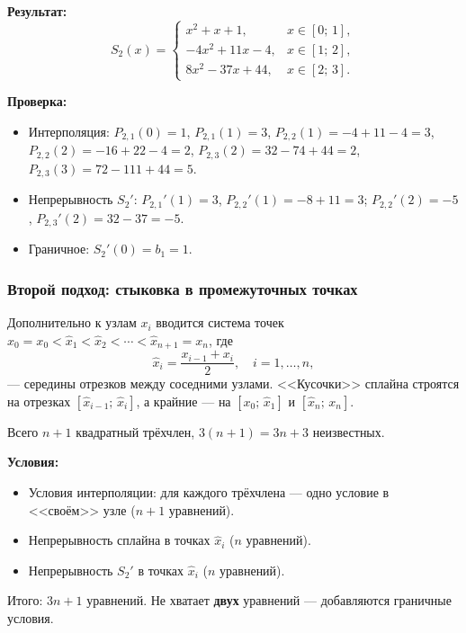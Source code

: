 \textbf{Результат:}
\[
    S_2(x) = \begin{cases}
        x^2 + x + 1, & x \in [0;\, 1], \\
        -4x^2 + 11x - 4, & x \in [1;\, 2], \\
        8x^2 - 37x + 44, & x \in [2;\, 3].
    \end{cases}
\]

\textbf{Проверка:}
\begin{itemize}
    \item Интерполяция: $P_{2,1}(0) = 1$\;\checkmark, $P_{2,1}(1) = 3$\;\checkmark, $P_{2,2}(1) = -4+11-4 = 3$\;\checkmark, $P_{2,2}(2) = -16+22-4 = 2$\;\checkmark, $P_{2,3}(2) = 32-74+44 = 2$\;\checkmark, $P_{2,3}(3) = 72-111+44 = 5$\;\checkmark.
    \item Непрерывность $S_2'$: $P_{2,1}'(1) = 3$, $P_{2,2}'(1) = -8+11 = 3$\;\checkmark; $P_{2,2}'(2) = -5$, $P_{2,3}'(2) = 32-37 = -5$\;\checkmark.
    \item Граничное: $S_2'(0) = b_1 = 1$\;\checkmark.
\end{itemize}


\subsubsection*{Второй подход: стыковка в промежуточных точках}

Дополнительно к узлам $x_i$ вводится система точек $\hat{x}_0 = x_0 < \hat{x}_1 < \hat{x}_2 < \cdots < \hat{x}_{n+1} = x_n$, где
\[
    \hat{x}_i = \frac{x_{i-1} + x_i}{2}, \quad i = 1, \ldots, n,
\]
--- середины отрезков между соседними узлами. <<Кусочки>> сплайна строятся на отрезках $[\hat{x}_{i-1};\, \hat{x}_i]$, а крайние --- на $[x_0;\, \hat{x}_1]$ и $[\hat{x}_n;\, x_n]$.

Всего $n + 1$ квадратный трёхчлен, $3(n+1) = 3n + 3$ неизвестных.

\textbf{Условия:}
\begin{itemize}
    \item Условия интерполяции: для каждого трёхчлена --- одно условие в <<своём>> узле ($n + 1$ уравнений).
    \item Непрерывность сплайна в точках $\hat{x}_i$ ($n$ уравнений).
    \item Непрерывность $S_2'$ в точках $\hat{x}_i$ ($n$ уравнений).
\end{itemize}

Итого: $3n + 1$ уравнений. Не хватает \textbf{двух} уравнений --- добавляются граничные условия.


